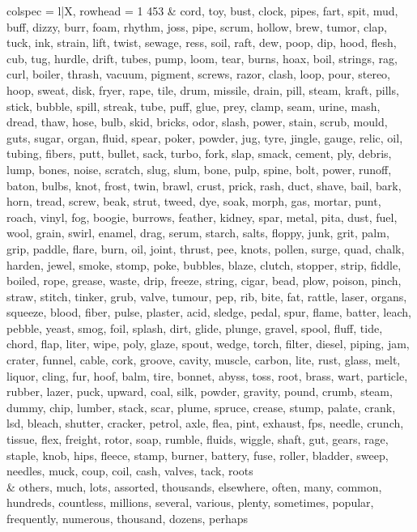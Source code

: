 \begin{tblr}[
  long,
  caption = {Examples from SNLI.},
  entry = {Short Caption},
  label = {tblr:test},
]{
colspec = {l|X},
rowhead = 1}
453 & cord, toy, bust, clock, pipes, fart, spit, mud, buff, dizzy, burr, foam, rhythm, joss, pipe, scrum, hollow, brew, tumor, clap, tuck, ink, strain, lift, twist, sewage, ress, soil, raft, dew, poop, dip, hood, flesh, cub, tug, hurdle, drift, tubes, pump, loom, tear, burns, hoax, boil, strings, rag, curl, boiler, thrash, vacuum, pigment, screws, razor, clash, loop, pour, stereo, hoop, sweat, disk, fryer, rape, tile, drum, missile, drain, pill, steam, kraft, pills, stick, bubble, spill, streak, tube, puff, glue, prey, clamp, seam, urine, mash, dread, thaw, hose, bulb, skid, bricks, odor, slash, power, stain, scrub, mould, guts, sugar, organ, fluid, spear, poker, powder, jug, tyre, jingle, gauge, relic, oil, tubing, fibers, putt, bullet, sack, turbo, fork, slap, smack, cement, ply, debris, lump, bones, noise, scratch, slug, slum, bone, pulp, spine, bolt, power, runoff, baton, bulbs, knot, frost, twin, brawl, crust, prick, rash, duct, shave, bail, bark, horn, tread, screw, beak, strut, tweed, dye, soak, morph, gas, mortar, punt, roach, vinyl, fog, boogie, burrows, feather, kidney, spar, metal, pita, dust, fuel, wool, grain, swirl, enamel, drag, serum, starch, salts, floppy, junk, grit, palm, grip, paddle, flare, burn, oil, joint, thrust, pee, knots, pollen, surge, quad, chalk, harden, jewel, smoke, stomp, poke, bubbles, blaze, clutch, stopper, strip, fiddle, boiled, rope, grease, waste, drip, freeze, string, cigar, bead, plow, poison, pinch, straw, stitch, tinker, grub, valve, tumour, pep, rib, bite, fat, rattle, laser, organs, squeeze, blood, fiber, pulse, plaster, acid, sledge, pedal, spur, flame, batter, leach, pebble, yeast, smog, foil, splash, dirt, glide, plunge, gravel, spool, fluff, tide, chord, flap, liter, wipe, poly, glaze, spout, wedge, torch, filter, diesel, piping, jam, crater, funnel, cable, cork, groove, cavity, muscle, carbon, lite, rust, glass, melt, liquor, cling, fur, hoof, balm, tire, bonnet, abyss, toss, root, brass, wart, particle, rubber, lazer, puck, upward, coal, silk, powder, gravity, pound, crumb, steam, dummy, chip, lumber, stack, scar, plume, spruce, crease, stump, palate, crank, lsd, bleach, shutter, cracker, petrol, axle, flea, pint, exhaust, fps, needle, crunch, tissue, flex, freight, rotor, soap, rumble, fluids, wiggle, shaft, gut, gears, rage, staple, knob, hips, fleece, stamp, burner, battery, fuse, roller, bladder, sweep, needles, muck, coup, coil, cash, valves, tack, roots \\ & others, much, lots, assorted, thousands, elsewhere, often, many, common, hundreds, countless, millions, several, various, plenty, sometimes, popular, frequently, numerous, thousand, dozens, perhaps \\\midrule

\end{tblr}
